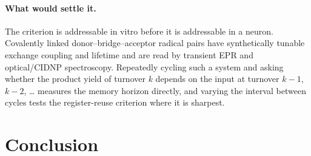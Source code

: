 \documentclass[aps,prx,reprint,superscriptaddress,nofootinbib,floatfix]{revtex4-2}
\begin{document}
\paragraph*{What would settle it.}
The criterion is addressable in vitro before it is addressable in a neuron.
Covalently linked donor--bridge--acceptor radical pairs have synthetically tunable
exchange coupling and lifetime and are read by transient EPR and optical/CIDNP
spectroscopy.\cite{Wasielewski2006,Wasielewski2020,Hore2016} Repeatedly cycling such
a system and asking whether the product yield of turnover $k$ depends on the input
at turnover $k-1$, $k-2$, \ldots{} measures the memory horizon directly, and varying
the interval between cycles tests the register-reuse criterion where it is sharpest.

\section{Conclusion}
\end{document}

